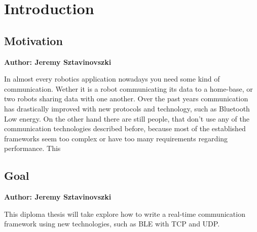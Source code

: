 \chapter{Introduction}

\makeatletter
\renewcommand\paragraph{\@startsection{paragraph}{4}{\z@}%
                                     {-3.25ex\@plus -1ex \@minus -.2ex}%
                                     {1.5ex \@plus .2ex}%
                                     {\normalfont\normalsize\bfseries}}
 \setcounter{secnumdepth}{4}
\makeatother

\vspace{2mm}

\section{Motivation}
\textbf{Author: Jeremy Sztavinovszki}

In almost every robotics application nowadays you need some kind of communication. Wether it is a robot communicating
its data to a home-base, or two robots sharing data with one another. Over the past years communication has drastically
improved with new protocols and technology, such as Bluetooth Low energy. On the other hand there are still people, that
don't use any of the communication technologies described before, because most of the established frameworks seem too
complex or have too many requirements regarding performance. This 

\section{Goal}
\textbf{Author: Jeremy Sztavinovszki}

This diploma thesis will take explore how to write a real-time communication framework using new technologies, such as BLE with TCP
and UDP.

